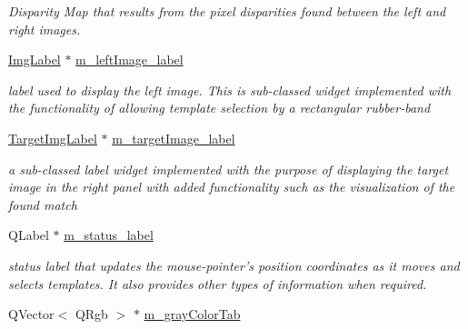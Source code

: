 \begin{DoxyCompactItemize}
\begin{DoxyCompactList}\small\item\em Disparity Map that results from the pixel disparities found between the left and right images. \item\end{DoxyCompactList}\item 
\hypertarget{classQcorr_acadb3032fbf41f8f1b27067c2784efef}{
\hyperlink{classImgLabel}{ImgLabel} $\ast$ \hyperlink{classQcorr_acadb3032fbf41f8f1b27067c2784efef}{m\_\-leftImage\_\-label}}
\label{classQcorr_acadb3032fbf41f8f1b27067c2784efef}

\begin{DoxyCompactList}\small\item\em label used to display the left image. This is sub-\/classed widget implemented with the functionality of allowing template selection by a rectangular rubber-\/band \item\end{DoxyCompactList}\item 
\hypertarget{classQcorr_a8d1e1ab866a811003c435c45de1e958e}{
\hyperlink{classTargetImgLabel}{TargetImgLabel} $\ast$ \hyperlink{classQcorr_a8d1e1ab866a811003c435c45de1e958e}{m\_\-targetImage\_\-label}}
\label{classQcorr_a8d1e1ab866a811003c435c45de1e958e}

\begin{DoxyCompactList}\small\item\em a sub-\/classed label widget implemented with the purpose of displaying the target image in the right panel with added functionality such as the visualization of the found match \item\end{DoxyCompactList}\item 
\hypertarget{classQcorr_a1bf4a70aa6c4e171f2e0613109bb57e9}{
QLabel $\ast$ \hyperlink{classQcorr_a1bf4a70aa6c4e171f2e0613109bb57e9}{m\_\-status\_\-label}}
\label{classQcorr_a1bf4a70aa6c4e171f2e0613109bb57e9}

\begin{DoxyCompactList}\small\item\em status label that updates the mouse-\/pointer's position coordinates as it moves and selects templates. It also provides other types of information when required. \item\end{DoxyCompactList}\item 
\hypertarget{classQcorr_afa1be55387e39ce5b81e72ecab75b5bc}{
QVector$<$ QRgb $>$ $\ast$ \hyperlink{classQcorr_afa1be55387e39ce5b81e72ecab75b5bc}{m\_\-grayColorTab}}
\label{classQcorr_afa1be55387e39ce5b81e72ecab75b5bc}


\end{DoxyCompactItemize}
